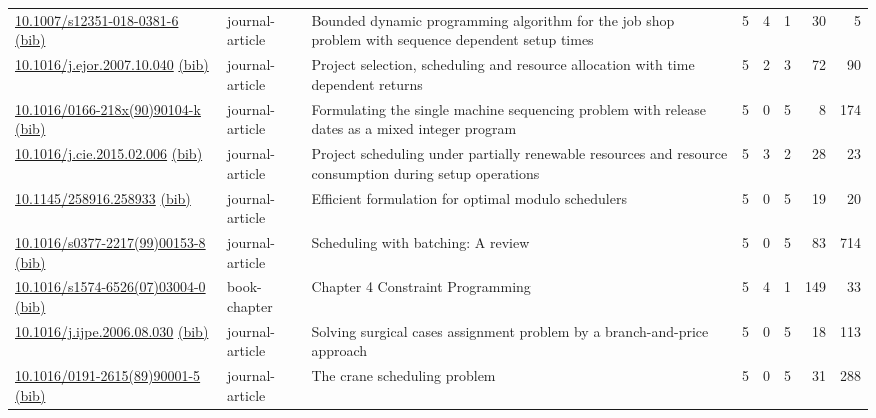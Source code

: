{\begin{longtable}{p{5cm}lp{11cm}rrrrr}
\href{http://dx.doi.org/10.1007/s12351-018-0381-6}{10.1007/s12351-018-0381-6} \href{https://www.doi2bib.org/bib/10.1007/s12351-018-0381-6}{(bib)} & journal-article & Bounded dynamic programming algorithm for the job shop problem with sequence dependent setup times & 5 & 4 & 1 & 30 & 5 \\
\href{http://dx.doi.org/10.1016/j.ejor.2007.10.040}{10.1016/j.ejor.2007.10.040} \href{https://www.doi2bib.org/bib/10.1016/j.ejor.2007.10.040}{(bib)} & journal-article & Project selection, scheduling and resource allocation with time dependent returns & 5 & 2 & 3 & 72 & 90 \\
\href{http://dx.doi.org/10.1016/0166-218x(90)90104-k}{10.1016/0166-218x(90)90104-k} \href{https://www.doi2bib.org/bib/10.1016/0166-218x(90)90104-k}{(bib)} & journal-article & Formulating the single machine sequencing problem with release dates as a mixed integer program & 5 & 0 & 5 & 8 & 174 \\
\href{http://dx.doi.org/10.1016/j.cie.2015.02.006}{10.1016/j.cie.2015.02.006} \href{https://www.doi2bib.org/bib/10.1016/j.cie.2015.02.006}{(bib)} & journal-article & Project scheduling under partially renewable resources and resource consumption during setup operations & 5 & 3 & 2 & 28 & 23 \\
\href{http://dx.doi.org/10.1145/258916.258933}{10.1145/258916.258933} \href{https://www.doi2bib.org/bib/10.1145/258916.258933}{(bib)} & journal-article & Efficient formulation for optimal modulo schedulers & 5 & 0 & 5 & 19 & 20 \\
\href{http://dx.doi.org/10.1016/s0377-2217(99)00153-8}{10.1016/s0377-2217(99)00153-8} \href{https://www.doi2bib.org/bib/10.1016/s0377-2217(99)00153-8}{(bib)} & journal-article & Scheduling with batching: A review & 5 & 0 & 5 & 83 & 714 \\
\href{http://dx.doi.org/10.1016/s1574-6526(07)03004-0}{10.1016/s1574-6526(07)03004-0} \href{https://www.doi2bib.org/bib/10.1016/s1574-6526(07)03004-0}{(bib)} & book-chapter & Chapter 4 Constraint Programming & 5 & 4 & 1 & 149 & 33 \\
\href{http://dx.doi.org/10.1016/j.ijpe.2006.08.030}{10.1016/j.ijpe.2006.08.030} \href{https://www.doi2bib.org/bib/10.1016/j.ijpe.2006.08.030}{(bib)} & journal-article & Solving surgical cases assignment problem by a branch-and-price approach & 5 & 0 & 5 & 18 & 113 \\
\href{http://dx.doi.org/10.1016/0191-2615(89)90001-5}{10.1016/0191-2615(89)90001-5} \href{https://www.doi2bib.org/bib/10.1016/0191-2615(89)90001-5}{(bib)} & journal-article & The crane scheduling problem & 5 & 0 & 5 & 31 & 288 \\

\end{longtable}}
